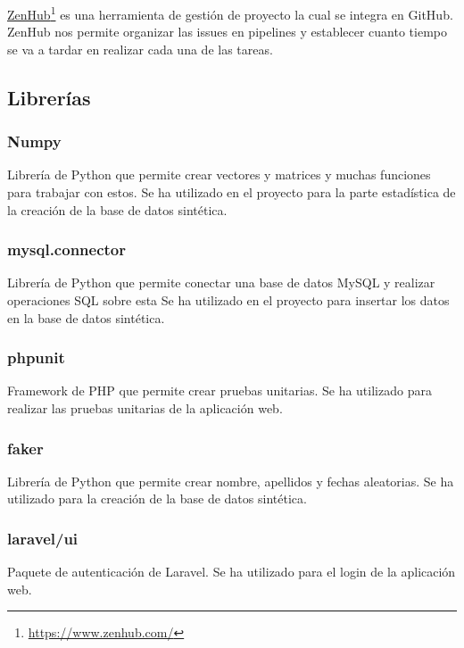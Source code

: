\href{https://www.zenhub.com/}{ZenHub}\footnote{\href{https://www.zenhub.com/}{https://www.zenhub.com/}} es una herramienta de gestión de proyecto la cual se integra en GitHub. ZenHub nos permite organizar las issues en pipelines y establecer cuanto tiempo se va a tardar en realizar cada una de las tareas.

\subsection{Librerías}\label{librerias}

\subsubsection{Numpy}

Librería de Python que permite crear vectores y matrices y muchas funciones para trabajar con estos. Se ha utilizado en el proyecto para la parte estadística de la creación de la base de datos sintética.  

\subsubsection{mysql.connector}

Librería de Python que permite conectar una base de datos MySQL y realizar operaciones SQL sobre esta Se ha utilizado en el proyecto para insertar los datos en la base de datos sintética.

\subsubsection{phpunit}

Framework de PHP que permite crear pruebas unitarias. Se ha utilizado para realizar las pruebas unitarias de la aplicación web.

\subsubsection{faker}

Librería de Python que permite crear nombre, apellidos y fechas aleatorias. Se ha utilizado para la creación de la base de datos sintética. 

\subsubsection{laravel/ui}

Paquete de autenticación de Laravel. Se ha utilizado para el login de la aplicación web.


